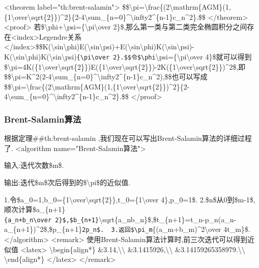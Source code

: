 \documentclass[
]{article}
\begin{document}
\textless theorem label="th:brent-salamin"\textgreater{}
\$\$\textbackslash pi=\textbackslash frac\{(2\textbackslash mathrm\{AGM\}(1,\{1\textbackslash over\textbackslash sqrt\{2\}\})\^{}2\}\{2-4\textbackslash sum\_\{n=0\}\^{}\textbackslash infty2\^{}\{n-1\}c\_n\^{}2\}.\$\$
\textless/theorem\textgreater{} \textless proof\textgreater{}
若\$\textbackslash phi+\textbackslash psi=\{\textbackslash pi\textbackslash over
2\}\$,那么第一类与第二类完全椭圆积分之间存在\textless index\textgreater Legendre关系\textless/index\textgreater\$\$K(\textbackslash sin\textbackslash phi)E(\textbackslash sin\textbackslash psi)+E(\textbackslash sin\textbackslash phi)K(\textbackslash sin\textbackslash psi)-K(\textbackslash sin\textbackslash phi)K(\textbackslash sin\textbackslash psi)\texttt{\{\textbackslash{}pi\textbackslash{}over\ 2\}.\$\$令\$\textbackslash{}phi}\textbackslash psi=\{\textbackslash pi\textbackslash over
4\}\$就可以得到\$\textbackslash pi=4K(\{1\textbackslash over\textbackslash sqrt\{2\}\})E(\{1\textbackslash over\textbackslash sqrt\{2\}\})-2K(\{1\textbackslash over\textbackslash sqrt\{2\}\})\^{}2\$,即\$\$\textbackslash pi=K\^{}2(2-4\textbackslash sum\_\{n=0\}\^{}\textbackslash infty2\^{}\{n-1\}c\_n\^{}2),\$\$也可以写成\$\$\textbackslash pi=\textbackslash frac\{(2\textbackslash mathrm\{AGM\}(1,\{1\textbackslash over\textbackslash sqrt\{2\}\})\^{}2\}\{2-4\textbackslash sum\_\{n=0\}\^{}\textbackslash infty2\^{}\{n-1\}c\_n\^{}2\}.\$\$
\textless/proof\textgreater{}

\hypertarget{brent-salaminux7b97ux6cd5}{%
\subsubsection{Brent-Salamin算法}\label{brent-salaminux7b97ux6cd5}}

根据定理\#\#th:brent-salamin
,我们现在可以写出Brent-Salamin算法的详细过程了. \textless algorithm
name="Brent-Salamin算法"\textgreater{}

输入:迭代次数\$m\$.

输出:迭代\$m\$次后得到的\$\textbackslash pi\$的近似值.

1.令\$a\_0=1,b\_0=\{1\textbackslash over\textbackslash sqrt\{2\}\},t\_0=\{1\textbackslash over
4\},p\_0=1\$.
2.\$n\$从0到\$m-1\$,顺次计算\$a\_\{n+1\}\texttt{\{a\_n+b\_n\textbackslash{}over\ 2\}\$,\$b\_\{n+1\}}\textbackslash sqrt\{a\_nb\_n\}\$,\$t\_\{n+1\}=t\_n-p\_n(a\_n-a\_\{n+1\})\^{}2\$,\$p\_\{n+1\}\texttt{2p\_n\$.
\ 3.返回\$\textbackslash{}pi\_m}\{(a\_m+b\_m)\^{}2\textbackslash over
4t\_m\}\$. \textless/algorithm\textgreater{}
\textless remark\textgreater{}
使用Brent-Salamin算法计算时,前三次迭代可以得到近似值
\textless latex\textgreater{} \textbackslash begin\{align*\}
\&3.14,\textbackslash\textbackslash{}
\&3.1415926,\textbackslash\textbackslash{}
\&3.14159265358979.\textbackslash\textbackslash{}
\textbackslash end\{align*\} \textless/latex\textgreater{}
\textless/remark\textgreater{}
\end{document}
